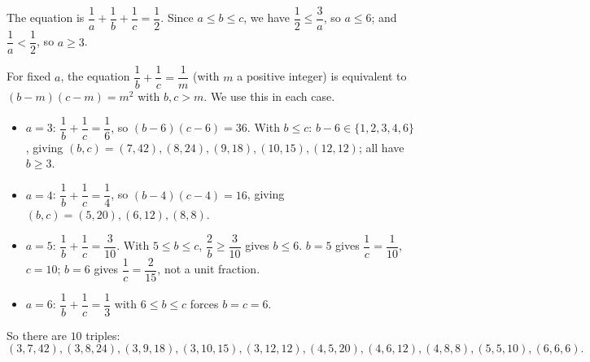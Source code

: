 The equation is $\dfrac{1}{a}+\dfrac{1}{b}+\dfrac{1}{c}=\dfrac{1}{2}$. Since $a\le b\le c$, we have $\dfrac{1}{2}\le\dfrac{3}{a}$, so $a\le6$; and $\dfrac{1}{a}<\dfrac{1}{2}$, so $a\ge3$.

For fixed $a$, the equation $\dfrac{1}{b}+\dfrac{1}{c}=\dfrac{1}{m}$ (with $m$ a positive integer) is equivalent to $(b-m)(c-m)=m^2$ with $b,c>m$. We use this in each case.
\begin{itemize}
\item $a=3$: $\dfrac{1}{b}+\dfrac{1}{c}=\dfrac{1}{6}$, so $(b-6)(c-6)=36$. With $b\le c$: $b-6\in\{1,2,3,4,6\}$, giving $(b,c)=(7,42),(8,24),(9,18),(10,15),(12,12)$; all have $b\ge3$.
\item $a=4$: $\dfrac{1}{b}+\dfrac{1}{c}=\dfrac{1}{4}$, so $(b-4)(c-4)=16$, giving $(b,c)=(5,20),(6,12),(8,8)$.
\item $a=5$: $\dfrac{1}{b}+\dfrac{1}{c}=\dfrac{3}{10}$. With $5\le b\le c$, $\dfrac{2}{b}\ge\dfrac{3}{10}$ gives $b\le6$. $b=5$ gives $\dfrac{1}{c}=\dfrac{1}{10}$, $c=10$; $b=6$ gives $\dfrac{1}{c}=\dfrac{2}{15}$, not a unit fraction.
\item $a=6$: $\dfrac{1}{b}+\dfrac{1}{c}=\dfrac{1}{3}$ with $6\le b\le c$ forces $b=c=6$.
\end{itemize}
So there are $10$ triples:
\[
\boxed{(3,7,42),(3,8,24),(3,9,18),(3,10,15),(3,12,12),(4,5,20),(4,6,12),(4,8,8),(5,5,10),(6,6,6)}.
\]
